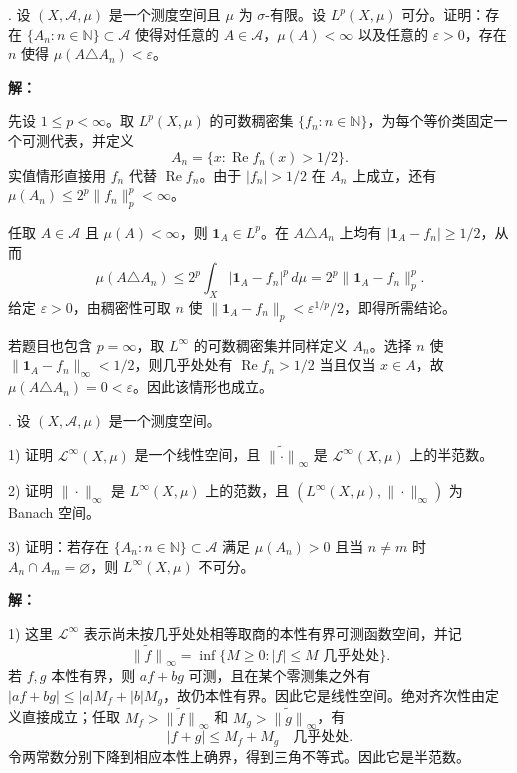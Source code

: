 \documentclass{article}
\begin{document}
\par\medskip{}. 设 $(X,\mathcal A,\mu)$ 是一个测度空间且 $\mu$ 为 $\sigma$-有限。设 $L^p(X,\mu)$ 可分。证明：存在 $\{A_n:n\in\mathbb N\}\subset\mathcal A$ 使得对任意的 $A\in\mathcal A$，$\mu(A)<\infty$ 以及任意的 $\varepsilon>0$，存在 $n$ 使得 $\mu(A\triangle A_n)<\varepsilon$。


\par{}\noindent\textbf{解：}\par\nopagebreak[4]



先设 $1\le p<\infty$。取 $L^p(X,\mu)$ 的可数稠密集 $\{f_n:n\in\mathbb N\}$，为每个等价类固定一个可测代表，并定义
\[
A_n=\{x:\operatorname{Re}f_n(x)>1/2\}.
\]
实值情形直接用 $f_n$ 代替 $\operatorname{Re}f_n$。由于 $|f_n|>1/2$ 在 $A_n$ 上成立，还有 $\mu(A_n)\le2^p\|f_n\|_p^p<\infty$。

任取 $A\in\mathcal A$ 且 $\mu(A)<\infty$，则 $\mathbf1_A\in L^p$。在 $A\triangle A_n$ 上均有 $|\mathbf1_A-f_n|\ge1/2$，从而
\[
\mu(A\triangle A_n)\le2^p\int_X|\mathbf1_A-f_n|^p\,d\mu=2^p\|\mathbf1_A-f_n\|_p^p.
\]
给定 $\varepsilon>0$，由稠密性可取 $n$ 使 $\|\mathbf1_A-f_n\|_p<\varepsilon^{1/p}/2$，即得所需结论。

若题目也包含 $p=\infty$，取 $L^\infty$ 的可数稠密集并同样定义 $A_n$。选择 $n$ 使 $\|\mathbf1_A-f_n\|_\infty<1/2$，则几乎处处有 $\operatorname{Re}f_n>1/2$ 当且仅当 $x\in A$，故 $\mu(A\triangle A_n)=0<\varepsilon$。因此该情形也成立。


\par\medskip{}. 设 $(X,\mathcal A,\mu)$ 是一个测度空间。

1) 证明 $\mathcal L^\infty(X,\mu)$ 是一个线性空间，且 $\widetilde{\|\cdot\|}_\infty$ 是 $\mathcal L^\infty(X,\mu)$ 上的半范数。

2) 证明 $\|\cdot\|_\infty$ 是 $L^\infty(X,\mu)$ 上的范数，且 $(L^\infty(X,\mu),\|\cdot\|_\infty)$ 为 Banach 空间。

3) 证明：若存在 $\{A_n:n\in\mathbb N\}\subset\mathcal A$ 满足 $\mu(A_n)>0$ 且当 $n\ne m$ 时 $A_n\cap A_m=\varnothing$，则 $L^\infty(X,\mu)$ 不可分。


\par{}\noindent\textbf{解：}\par\nopagebreak[4]



1) 这里 $\mathcal L^\infty$ 表示尚未按几乎处处相等取商的本性有界可测函数空间，并记
\[
\widetilde{\|f\|}_\infty=\inf\{M\ge0:|f|\le M\text{ 几乎处处}\}.
\]
若 $f,g$ 本性有界，则 $af+bg$ 可测，且在某个零测集之外有 $|af+bg|\le|a|M_f+|b|M_g$，故仍本性有界。因此它是线性空间。绝对齐次性由定义直接成立；任取 $M_f>\widetilde{\|f\|}_\infty$ 和 $M_g>\widetilde{\|g\|}_\infty$，有
\[
|f+g|\le M_f+M_g\quad\text{几乎处处}.
\]
令两常数分别下降到相应本性上确界，得到三角不等式。因此它是半范数。
\end{document}
